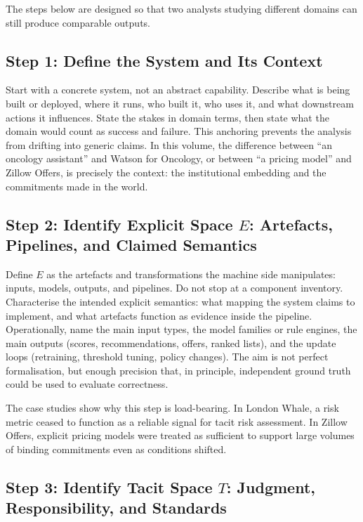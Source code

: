 The steps below are designed so that two analysts studying different domains can still produce comparable outputs.

\subsection{Step 1: Define the System and Its Context}

Start with a concrete system, not an abstract capability. Describe what is being built or deployed, where it runs, who built it, who uses it, and what downstream actions it influences. State the stakes in domain terms, then state what the domain would count as success and failure. This anchoring prevents the analysis from drifting into generic claims. In this volume, the difference between ``an oncology assistant'' and Watson for Oncology, or between ``a pricing model'' and Zillow Offers, is precisely the context: the institutional embedding and the commitments made in the world.

\subsection{Step 2: Identify Explicit Space \(E\): Artefacts, Pipelines, and Claimed Semantics}

Define \(E\) as the artefacts and transformations the machine side manipulates: inputs, models, outputs, and pipelines. Do not stop at a component inventory. Characterise the intended explicit semantics: what mapping the system claims to implement, and what artefacts function as evidence inside the pipeline. Operationally, name the main input types, the model families or rule engines, the main outputs (scores, recommendations, offers, ranked lists), and the update loops (retraining, threshold tuning, policy changes). The aim is not perfect formalisation, but enough precision that, in principle, independent ground truth could be used to evaluate correctness.

The case studies show why this step is load-bearing. In London Whale, a risk metric ceased to function as a reliable signal for tacit risk assessment. In Zillow Offers, explicit pricing models were treated as sufficient to support large volumes of binding commitments even as conditions shifted.

\subsection{Step 3: Identify Tacit Space \(T\): Judgment, Responsibility, and Standards}

